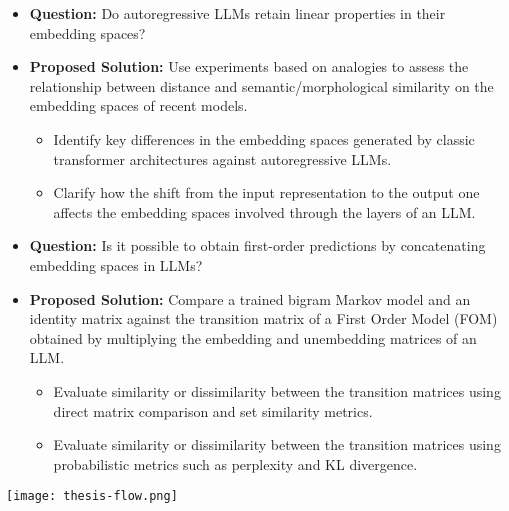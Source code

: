 \documentclass[aspectratio=169, 12pt]{beamer}
\begin{document}
    \begin{frame}{}
        \begin{itemize}[<+|visible@+->]
            \item<1-1> \textbf{Question:} Do autoregressive LLMs retain linear properties in their embedding spaces?
            \item<2-4> \textbf{Proposed Solution:} Use experiments based on analogies to assess the relationship between distance and semantic/morphological similarity on the embedding spaces of recent models.
            \begin{itemize}[<+|visible@+->]
                \item<3-3> Identify key differences in the embedding spaces generated by classic transformer architectures against autoregressive LLMs.
                \item<4-4> Clarify how the shift from the input representation to the output one affects the embedding spaces involved through the layers of an LLM.
            \end{itemize}
        \end{itemize}
    \end{frame}

    \begin{frame}{}
        \begin{itemize}[<+|visible@+->]
            \item<1-1> \textbf{Question:} Is it possible to obtain first-order predictions by concatenating embedding spaces in LLMs?
            \item<2-4> \textbf{Proposed Solution:} Compare a trained bigram Markov model and an identity matrix against the transition matrix of a First Order Model (FOM) obtained by multiplying the embedding and unembedding matrices of an LLM.
            \begin{itemize}[<+|visible@+->]
                \item<3-3> Evaluate similarity or dissimilarity between the transition matrices using direct matrix comparison and set similarity metrics.
                \item<4-4> Evaluate similarity or dissimilarity between the transition matrices using probabilistic metrics such as perplexity and KL divergence.
            \end{itemize}
        \end{itemize}
    \end{frame}

    \begin{frame}{}
        \center
        \texttt{[image: thesis-flow.png]}
    \end{frame}
\end{document}
